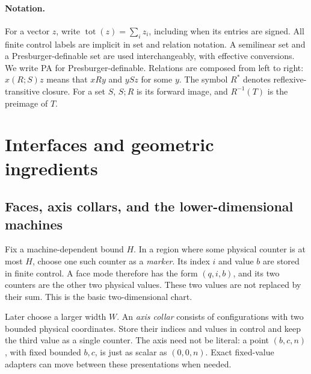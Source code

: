 \documentclass[11pt,a4paper]{article}
\theoremstyle{remark}
\newcommand{\tot}[1]{\operatorname{tot}(#1)}
\begin{document}
\paragraph{Notation.}
For a vector \(z\), write \(\tot{z}=\sum_i z_i\), including when its
entries are signed. All finite control labels are implicit in set and
relation notation. A semilinear set and a Presburger-definable set are
used interchangeably, with effective conversions.
We write PA for Presburger-definable. Relations are composed from left to
right: \(x(R;S)z\) means that \(xRy\) and \(ySz\) for some \(y\).
The symbol \(R^*\) denotes reflexive-transitive closure. For a set \(S\),
\(S;R\) is its forward image, and \(R^{-1}(T)\) is the preimage of \(T\).

\section{Interfaces and geometric ingredients}\label{sec:ingredients}

\subsection{Faces, axis collars, and the lower-dimensional machines}

Fix a machine-dependent bound \(H\). In a region where some physical
counter is at most \(H\), choose one such counter as a \emph{marker}.
Its index \(i\) and value \(b\) are stored in finite control. A face
mode therefore has the form \((q,i,b)\), and its two counters are the
other two physical values. These two values are not replaced by their
sum. This is the basic two-dimensional chart.

Later choose a larger width \(W\). An \emph{axis collar} consists of
configurations with two bounded physical coordinates. Store their
indices and values in control and keep the third value as a single
counter. The axis need not be literal: a point \((b,c,n)\), with fixed
bounded \(b,c\), is just as scalar as \((0,0,n)\). Exact fixed-value
adapters can move between these presentations when needed.
\end{document}
